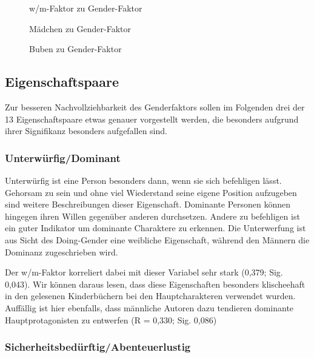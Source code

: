 \begin{figure}
\center
  \caption[w/m-Faktor--Gender-Faktor]{w/m-Faktor zu Gender-Faktor}
  \label{wm-gender}


\end{figure}

\begin{figure}
\center
  \caption[Mädchen--Gender-Faktor]{Mädchen zu Gender-Faktor}
  \label{w-gender}


\end{figure}

\begin{figure}
\center
  \caption[Buben--Gender-Faktor]{Buben zu Gender-Faktor}
  \label{m-gender}


\end{figure}

\subsection{Eigenschaftspaare}

Zur besseren Nachvollziehbarkeit des Genderfaktors sollen im Folgenden
drei der 13 Eigenschaftspaare etwas genauer vorgestellt werden, die
besonders aufgrund ihrer Signifikanz besonders aufgefallen sind.

\subsubsection{Unterwürfig/Dominant}

Unterwürfig ist eine Person besonders dann, wenn sie sich befehligen
lässt. Gehorsam zu sein und ohne viel Wiederstand seine eigene Position
aufzugeben sind weitere Beschreibungen dieser Eigenschaft. Dominante
Personen können hingegen ihren Willen gegenüber anderen durchsetzen.
Andere zu befehligen ist ein guter Indikator um dominante Charaktere zu
erkennen. Die Unterwerfung ist aus Sicht des Doing-Gender eine weibliche
Eigenschaft, während den Männern die Dominanz zugeschrieben wird.

Der w/m-Faktor korreliert dabei mit dieser Variabel sehr stark (0,379;
Sig. 0,043). Wir können daraus lesen, dass diese Eigenschaften besonders
klischeehaft in den gelesenen Kinderbüchern bei den Hauptcharakteren
verwendet wurden. Auffällig ist hier ebenfalls, dass männliche Autoren
dazu tendieren dominante Hauptprotagonisten zu entwerfen (R = 0,330;
Sig. 0,086)

\subsubsection{Sicherheitsbedürftig/Abenteuerlustig}

